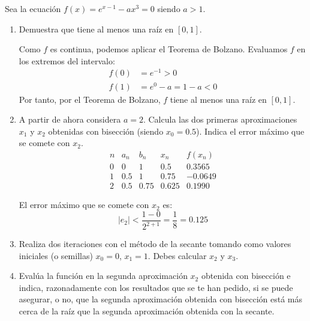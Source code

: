 \begin{ejercicio}
    Sea la ecuación $f(x) = e^{x-1} - ax^3 = 0$ siendo $a > 1$.
    \begin{enumerate}
        \item Demuestra que tiene al menos una raíz en $[0, 1]$.
        
        Como $f$ es continua, podemos aplicar el Teorema de Bolzano. Evaluamos $f$ en los extremos del intervalo:
        \begin{align*}
            f(0) &= e^{-1} > 0\\
            f(1) &= e^0 - a = 1 - a < 0
        \end{align*}
        Por tanto, por el Teorema de Bolzano, $f$ tiene al menos una raíz en $[0, 1]$.
        \item A partir de ahora considera $a = 2$. Calcula las dos primeras aproximaciones $x_1$ y $x_2$ obtenidas con bisección (siendo $x_0 = 0.5$). Indica el error máximo que se comete con $x_2$.
        \begin{equation*}
            \begin{array}{c|c|c|c|c}
                n & a_n & b_n & x_n & f(x_n) \\ \hline
                0 & 0 & 1 & 0.5 & 0.3565\\
                1 & 0.5 & 1 & 0.75 & -0.0649\\
                2 & 0.5 & 0.75 & 0.625 & 0.1990
            \end{array}
        \end{equation*}

        El error máximo que se comete con $x_2$ es:
        \begin{equation*}
            |e_2| < \dfrac{1-0}{2^{2+1}} = \dfrac{1}{8} = 0.125
        \end{equation*}
        \item Realiza dos iteraciones con el método de la secante tomando como valores iniciales (o semillas) $x_0 = 0$, $x_1 = 1$. Debes calcular $x_2$ y $x_3$.
        \item Evalúa la función en la segunda aproximación $x_2$ obtenida con bisección e indica, razonadamente con los resultados que se te han pedido, si se puede asegurar, o no, que la segunda aproximación obtenida con bisección está más cerca de la raíz que la segunda aproximación obtenida con la secante.
    \end{enumerate}
\end{ejercicio}

